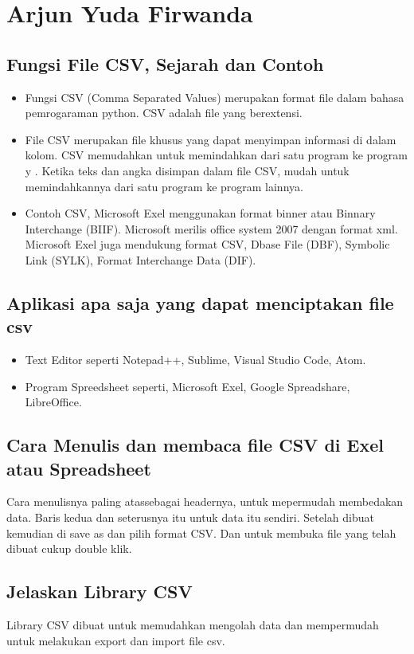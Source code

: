 \section{Arjun Yuda Firwanda}

\subsection {Fungsi File CSV, Sejarah dan Contoh}
\begin{itemize}
    \item Fungsi CSV (Comma Separated Values) merupakan format file dalam bahasa pemrogaraman python. CSV adalah file yang berextensi.
    \item File CSV merupakan file khusus yang dapat menyimpan informasi di dalam kolom. CSV memudahkan untuk memindahkan dari satu program ke program y .  Ketika teks dan angka disimpan dalam file CSV, mudah untuk memindahkannya dari satu program ke program lainnya. 
    \item Contoh CSV, Microsoft Exel menggunakan format binner atau Binnary Interchange (BIIF). Microsoft merilis office system 2007 dengan format xml. Microsoft Exel juga mendukung format CSV, Dbase File (DBF), Symbolic Link (SYLK), Format Interchange Data (DIF).
\end{itemize}

\subsection {Aplikasi apa saja yang dapat menciptakan file csv}
\begin{itemize}
    \item Text Editor seperti Notepad++, Sublime, Visual Studio Code, Atom.
    \item Program Spreedsheet seperti, Microsoft Exel, Google Spreadshare, LibreOffice.
\end{itemize}

\subsection {Cara Menulis dan membaca file CSV di Exel atau Spreadsheet}
Cara menulisnya paling atassebagai headernya, untuk mepermudah membedakan data. Baris kedua dan seterusnya itu untuk data itu sendiri. Setelah dibuat kemudian di save as dan pilih format CSV. Dan untuk membuka file yang telah dibuat cukup double klik.

\subsection {Jelaskan Library CSV}
Library CSV dibuat untuk memudahkan mengolah data dan mempermudah untuk melakukan export dan import file csv.

